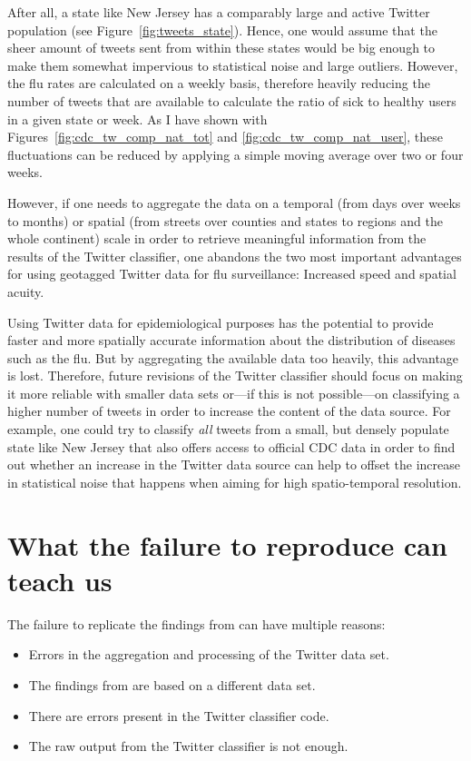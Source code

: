 \documentclass[11pt, a4paper,twoside]{report}\usepackage[]{graphicx}\usepackage[]{color}
\begin{document}
After all, a state like New Jersey has a comparably large and active Twitter population (see Figure~\ref{fig:tweets_state}). Hence, one would assume that the sheer amount of tweets sent from within these states would be big enough to make them somewhat impervious to statistical noise and large outliers. However, the flu rates are calculated on a weekly basis, therefore heavily reducing the number of tweets that are available to calculate the ratio of sick to healthy users in a given state or week. As I have shown with Figures~\ref{fig:cdc_tw_comp_nat_tot} and \ref{fig:cdc_tw_comp_nat_user}, these fluctuations can be reduced by applying a simple moving average over two or four weeks.

However, if one needs to aggregate the data on a temporal (from days over weeks to months) or spatial (from streets over counties and states to regions and the whole continent) scale in order to retrieve meaningful information from the results of the Twitter classifier, one abandons the two most important advantages for using geotagged Twitter data for flu surveillance: Increased speed and spatial acuity.

Using Twitter data for epidemiological purposes has the potential to provide faster and more spatially accurate information about the distribution of diseases such as the flu. But by aggregating the available data too heavily, this advantage is lost. Therefore, future revisions of the Twitter classifier should focus on making it more reliable with smaller data sets or---if this is not possible---on classifying a higher number of tweets in order to increase the content of the data source. For example, one could try to classify \textit{all} tweets from a small, but densely populate state like New Jersey that also offers access to official CDC data in order to find out whether an increase in the Twitter data source can help to offset the increase in statistical noise that happens when aiming for high spatio-temporal resolution.

\section{What the failure to reproduce can teach us}
\label{sec:disc_replication}
The failure to replicate the findings from \citep{bodnar_data_2015} can have multiple reasons: 

\begin{itemize}
\item Errors in the aggregation and processing of the Twitter data set.
\item The findings from \citep{bodnar_data_2015} are based on a different data set.
\item There are errors present in the Twitter classifier code.
\item The raw output from the Twitter classifier is not enough.
\end{itemize}
\end{document}
